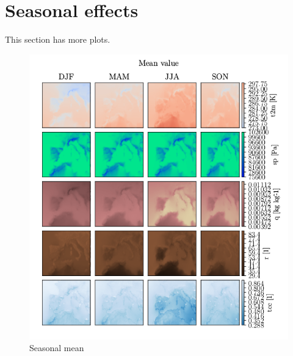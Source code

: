 \chapter{Seasonal effects}
This section has more plots. 
\begin{figure}[ht]
    \centering
    \includegraphics{python_figs/seasonal_mean_all_variables.png}
    \caption{Seasonal mean}
    \label{fig:seasonal_mean}
\end{figure}

